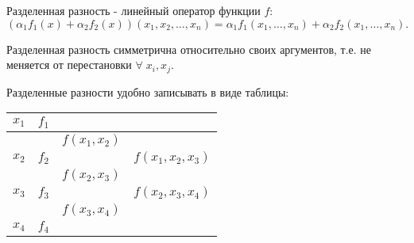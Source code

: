 \begin{consequences}
  \item Разделенная разность - линейный оператор функции $f$:
  \begin{equation*}
    \left( \alpha_1 f_1(x) + \alpha_2 f_2 (x) \right) (x_1, x_2, \ldots, x_n) = \alpha_1 f_1(x_1, \ldots, x_n) + \alpha_2 f_2(x_1, \ldots, x_n).
  \end{equation*}
  \item Разделенная разность симметрична относительно своих аргументов, т.е. не меняется от перестановки $\forall \; x_i, x_j$.
  \item Разделенные разности удобно записывать в виде таблицы:
  \begin{center}
    \begin{tabular}{ | c | c | c | c |}
      \hline
      $x_1$ & $f_1$ &              &                \\ \hline
            &       & $f(x_1, x_2)$ &                  \\ \hline
      $x_2$ & $f_2$ &               & $f(x_1, x_2, x_3)$ \\ \hline
            &       & $f(x_2, x_3)$ &                   \\ \hline
      $x_3$ & $f_3$ &               & $f(x_2, x_3, x_4)$\\ \hline
            &       & $f(x_3, x_4)$ &                   \\ \hline
      $x_4$ & $f_4$ &               &                 \\
        \hline
    \end{tabular}
  \end{center}
\end{consequences}
